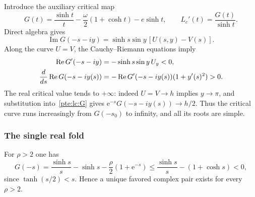\documentclass[11pt,a4paper]{article}
\numberwithin{equation}{section}
\theoremstyle{definition}
\theoremstyle{plain}
\newcommand{\ee}{\mathrm e}
\begin{document}
Introduce the auxiliary critical map
\begin{equation}\label{pte:lc:G}
 G(t)=\frac{\sinh t}{t}-\frac\omega2(1+\cosh t)-e\sinh t,
 \qquad L_c'(t)=\frac{G(t)}{\sinh t}.
\end{equation}
Direct algebra gives
\[
 \operatorname{Im}G(-s-iy)=\sinh s\sin y\,[U(s,y)-V(s)].
\]
Along the curve $U=V$, the Cauchy--Riemann equations imply
\begin{align}
 \operatorname{Re}G'(-s-iy)&=-\sinh s\sin y\,U_y<0,\notag\\
 \frac d{ds}\operatorname{Re}G(-s-iy(s))
 &=-\operatorname{Re}G'(-s-iy(s))(1+y'(s)^2)>0.\label{pte:lc:criticalcurve}
\end{align}
The real critical value tends to $+\infty$: indeed $U=V\to h$ implies $y\to\pi$, and substitution into~\eqref{pte:lc:G} gives $\ee^{-s}G(-s-iy(s))\to h/2$. Thus the critical curve runs increasingly from $G(-s_0)$ to infinity, and all its roots are simple.

\subsubsection{The single real fold}
For $\rho>2$ one has
\[
 G(-s)=\frac{\sinh s}{s}-\sinh s-\frac\rho2(1+\ee^{-s})
 \le\frac{\sinh s}{s}-(1+\cosh s)<0,
\]
since $\tanh(s/2)<s$. Hence a unique favored complex pair exists for every $\rho>2$.
\end{document}
